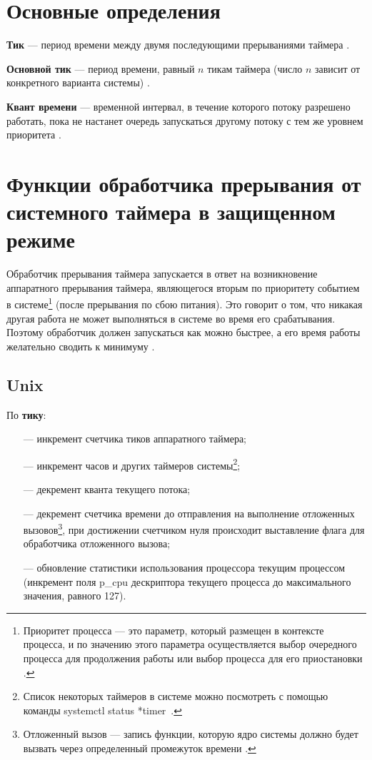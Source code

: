 \chapter{Основные определения}

\textbf{Тик} --- период времени между двумя последующими прерываниями таймера \cite{unix1}.

\textbf{Основной тик} --- период времени, равный $n$ тикам таймера (число $n$ зависит от конкретного варианта системы) \cite{unix1}.

\textbf{Квант времени} --- временной интервал, в течение которого потоку разрешено работать, пока не настанет очередь запускаться другому потоку с тем же уровнем приоритета \cite{win4}.

\chapter{Функции обработчика прерывания от системного таймера в защищенном режиме}

Обработчик прерывания таймера запускается в ответ на возникновение аппаратного прерывания таймера, являющегося вторым по приоритету событием в системе\footnote{Приоритет процесса --- это параметр, который размещен в контексте процесса, и по значению этого параметра осуществляется выбор очередного процесса для продолжения работы или выбор процесса для его приостановки \cite{plan}.} (после прерывания по сбою питания). Это говорит о том, что никакая другая работа не может выполняться в системе во время его срабатывания. Поэтому обработчик должен запускаться как можно быстрее, а его время работы желательно сводить к минимуму \cite{unix1}. 


\section{Unix}

По \textbf{тику}:

\begin{itemize}
    \item[---] инкремент счетчика тиков аппаратного таймера;
    \item[---] инкремент часов и других таймеров системы\footnote{Список некоторых таймеров в системе можно посмотреть с помощью команды {\ttfamily systemctl status *timer}~\cite{timer}.};
    \item[---] декремент кванта текущего потока;
    \item[---] декремент счетчика времени до отправления на выполнение отложенных вызовов\footnote{Отложенный вызов --- запись функции, которую ядро системы должно будет вызвать через определенный промежуток времени \cite{unix2}.}, при достижении счетчиком нуля происходит выставление флага для обработчика отложенного вызова;
    \item[---] обновление статистики использования процессора текущим процессом (инкремент поля {\ttfamily p\_cpu} дескриптора текущего процесса до максимального значения, равного 127).
\end{itemize}

